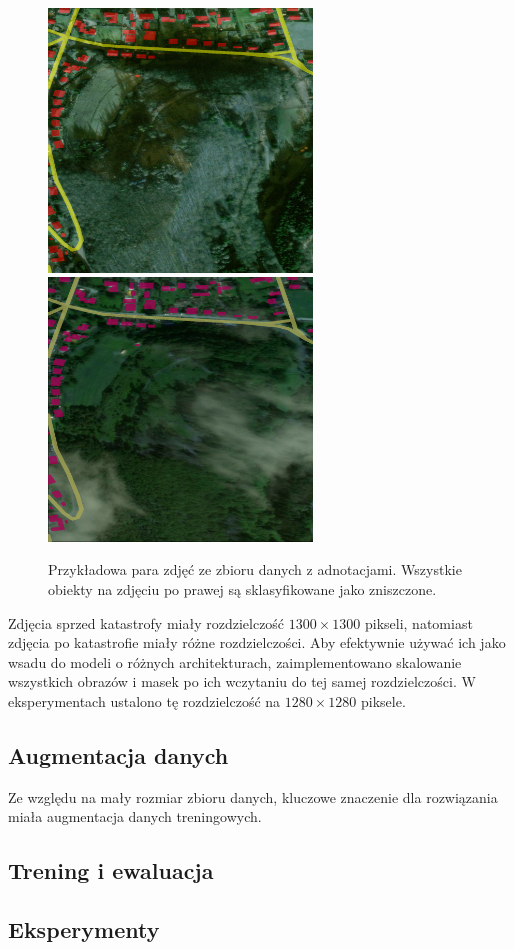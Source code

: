 \begin{figure}[h]
\centering
\includegraphics[width=7cm,height=7cm]{rysunki/10500500C4DD7000_0_30_69_PRE.png}
\includegraphics[width=7cm,height=7cm]{rysunki/10500500C4DD7000_0_30_69_POST.png}
\caption[Wizualizacja danych]{Przykładowa para zdjęć ze zbioru danych z adnotacjami. Wszystkie obiekty na zdjęciu po prawej są sklasyfikowane jako zniszczone.}
\end{figure}
Zdjęcia sprzed katastrofy miały rozdzielczość $1300\times 1300$ pikseli, natomiast zdjęcia po katastrofie miały różne rozdzielczości. Aby efektywnie używać ich jako wsadu do modeli o różnych architekturach, zaimplementowano skalowanie wszystkich obrazów i masek po ich wczytaniu do tej samej rozdzielczości. W eksperymentach ustalono tę rozdzielczość na $1280\times 1280$ piksele.
\subsection{Augmentacja danych}
Ze względu na mały rozmiar zbioru danych, kluczowe znaczenie dla rozwiązania miała augmentacja danych treningowych. 
\subsection{Trening i ewaluacja}

\subsection{Eksperymenty}

